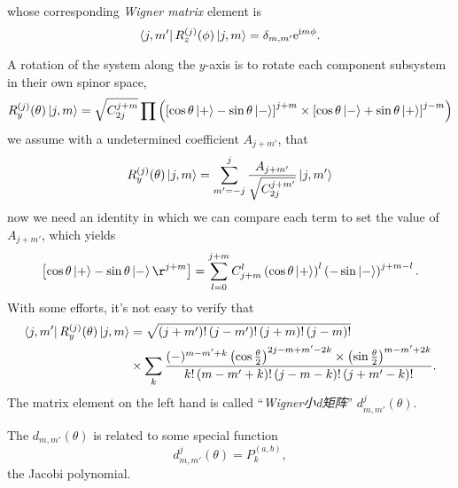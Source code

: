 whose corresponding \emph{Wigner matrix} element is
\begin{equation}
  \bra{j, m'} R_z^{(j)} (\phi) \ket{j,m} = \delta_{m,m'} \mathrm{e}^{\mathrm{i}m \phi}.
\end{equation}

A rotation of the system along the $y$-axis is to rotate each component subsystem in their own spinor space,
\begin{equation}
  R_y ^{(j)} (\theta) \ket{j,m} = \sqrt{C_{2j}^{j+m}} \prod \left( \left[ \cos \theta \ket{+} - \sin \theta \ket{-} \right]^{j+m} \times \left[ \cos \theta \ket{-} + \sin \theta \ket{+} \right]^{j-m} \right)
\end{equation}
we assume with a undetermined coefficient $A_{j+m'}$, that
\begin{equation}
  R_y ^{(j)} (\theta) \ket{j,m} = \sum_{m'=-j}^{j} \frac{A_{j+m'}}{\sqrt{C_{2j}^{j+m'}}} \ket{j, m'}
\end{equation}
now we need an identity in which we can compare each term to set the value of $A_{j+m'}$, which yields
\begin{equation}
  \left[ \cos \theta \ket{+} - \sin \theta \ket{-} \r^{j+m}\right] = 
  \sum_{l=0}^{j+m} C_{j+m}^{l} \left( \cos \theta \ket{+} \right)^{l} \left( - \sin \ket{-} \right)^{j+m-l}.
\end{equation}
With some efforts, it's not easy to verify that
\begin{equation}
  \begin{aligned}
    \bra{j,m'} R_y^{(j)} (\theta) \ket{j,m} 
    & = \sqrt{\left( j+m' \right)! \left( j-m' \right)! \left( j+m \right)! \left( j-m \right)!} 
    \\
    & \times \sum_{k} \frac{(-)^{m-m'+k} \left( \cos \frac{\theta}{2} \right)^{2j-m+m'-2k} \times \left( \sin \frac{\theta}{2} \right)^{m-m'+2k}}{k! \left( m-m'+k \right)! \left( j-m-k \right)! \left( j+m'-k \right)!}.
  \end{aligned}
\end{equation}
The matrix element on the left hand is called ``\emph{Wigner小d矩阵}'' $d_{m,m'}^{j}(\theta)$. 

The $d_{m,m'}(\theta)$ is related to some special function
\begin{equation}
  d_{m,m'}^{j}(\theta) = P_{k} ^{(a,b)},
\end{equation}
the Jacobi polynomial.
